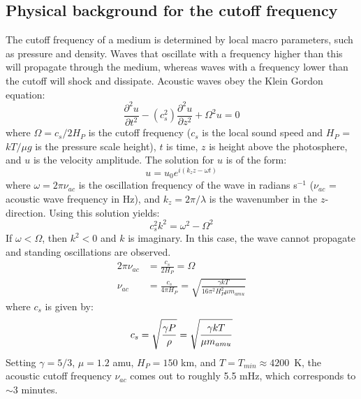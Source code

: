 \subsection{Physical background for the cutoff frequency}
The cutoff frequency of a medium is determined by local macro parameters,
such as pressure and density. Waves that oscillate with a frequency higher
than this will propagate through the medium, whereas waves with a frequency
lower than the cutoff will shock and dissipate. Acoustic waves obey the
Klein Gordon equation:
\begin{equation}
    \frac{\partial^{2}u}{\partial t^{2}} - \left( c_{s}^{2} \right)
    \frac{\partial^{2}u}{\partial z^{2}} + \Omega^{2}u = 0
\end{equation}
where $\Omega = c_{s}/2H_{P}$ is the cutoff frequency
($c_{s}$ is the local sound speed and
$H_{P}$ = $ kT / \mu g $ is the pressure scale height),
$t$ is time, $z$ is height
above the photosphere, and $u$ is the velocity amplitude.
The solution for $u$ is of the form:
\begin{equation}
    u = u_{0}e^{i\left( k_{z}z - \omega t \right)}
\end{equation}
where $\omega = 2 \pi \nu_{ac}$ is the oscillation frequency of the wave
in radians s$^{-1}$ ($\nu_{ac}$ = acoustic wave frequency in Hz),
and $k_{z} = 2\pi/\lambda$
is the wavenumber in the $z$-direction.
Using this solution yields:
\begin{equation}
    c_{s}^{2} k^{2} = \omega^{2} - \Omega^{2}
\end{equation}
If $\omega < \Omega$, then $k^{2} < 0$ and $k$ is imaginary.
In this case, the wave cannot propagate and standing oscillations are
observed.
\begin{align}
    2\pi\nu_{ac} &= \frac{c_{s}}{2H_{P}} = \Omega \\
    \nu_{ac} &= \frac{c_{s}}{4 \pi H_{P}}
    = \sqrt{ \frac{\gamma k T }{ 16 \pi^{2} H_{P}^{2} \mu m_{amu} } }
\end{align}
where $c_{s}$ is given by:
\begin{equation}
    c_{s}
    = \sqrt{ \frac{ \gamma P }{ \rho }}
    = \sqrt{ \frac{ \gamma k T }{ \mu m_{amu} }}\\
\end{equation}
Setting $\gamma = 5/3$, $\mu = 1.2$ amu, $H_{P} = 150$ km,
and $ T = T_{min} \approx 4200$~K,
the acoustic cutoff frequency $\nu_{ac}$ comes out to roughly
5.5 mHz, which corresponds to $\sim$3 minutes.


